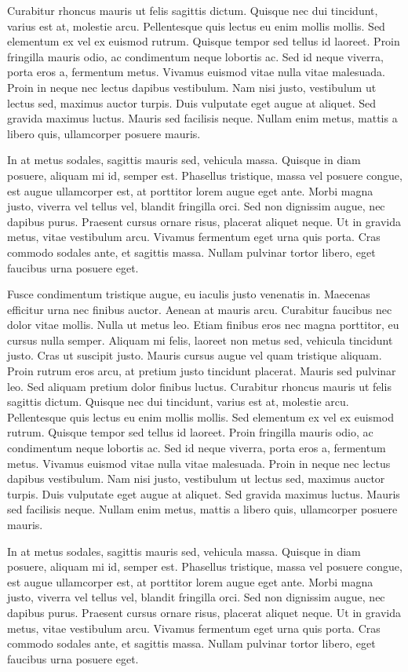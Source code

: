 Curabitur rhoncus mauris ut felis sagittis dictum. Quisque nec dui tincidunt, varius est at, molestie arcu. Pellentesque quis lectus eu enim mollis mollis. Sed elementum ex vel ex euismod rutrum. Quisque tempor sed tellus id laoreet. Proin fringilla mauris odio, ac condimentum neque lobortis ac. Sed id neque viverra, porta eros a, fermentum metus. Vivamus euismod vitae nulla vitae malesuada. Proin in neque nec lectus dapibus vestibulum. Nam nisi justo, vestibulum ut lectus sed, maximus auctor turpis. Duis vulputate eget augue at aliquet. Sed gravida maximus luctus. Mauris sed facilisis neque. Nullam enim metus, mattis a libero quis, ullamcorper posuere mauris.

In at metus sodales, sagittis mauris sed, vehicula massa. Quisque in diam posuere, aliquam mi id, semper est. Phasellus tristique, massa vel posuere congue, est augue ullamcorper est, at porttitor lorem augue eget ante. Morbi magna justo, viverra vel tellus vel, blandit fringilla orci. Sed non dignissim augue, nec dapibus purus. Praesent cursus ornare risus, placerat aliquet neque. Ut in gravida metus, vitae vestibulum arcu. Vivamus fermentum eget urna quis porta. Cras commodo sodales ante, et sagittis massa. Nullam pulvinar tortor libero, eget faucibus urna posuere eget.

Fusce condimentum tristique augue, eu iaculis justo venenatis in. Maecenas efficitur urna nec finibus auctor. Aenean at mauris arcu. Curabitur faucibus nec dolor vitae mollis. Nulla ut metus leo. Etiam finibus eros nec magna porttitor, eu cursus nulla semper. Aliquam mi felis, laoreet non metus sed, vehicula tincidunt justo. Cras ut suscipit justo. Mauris cursus augue vel quam tristique aliquam. Proin rutrum eros arcu, at pretium justo tincidunt placerat. Mauris sed pulvinar leo. Sed aliquam pretium dolor finibus luctus.
Curabitur rhoncus mauris ut felis sagittis dictum. Quisque nec dui tincidunt, varius est at, molestie arcu. Pellentesque quis lectus eu enim mollis mollis. Sed elementum ex vel ex euismod rutrum. Quisque tempor sed tellus id laoreet. Proin fringilla mauris odio, ac condimentum neque lobortis ac. Sed id neque viverra, porta eros a, fermentum metus. Vivamus euismod vitae nulla vitae malesuada. Proin in neque nec lectus dapibus vestibulum. Nam nisi justo, vestibulum ut lectus sed, maximus auctor turpis. Duis vulputate eget augue at aliquet. Sed gravida maximus luctus. Mauris sed facilisis neque. Nullam enim metus, mattis a libero quis, ullamcorper posuere mauris.

In at metus sodales, sagittis mauris sed, vehicula massa. Quisque in diam posuere, aliquam mi id, semper est. Phasellus tristique, massa vel posuere congue, est augue ullamcorper est, at porttitor lorem augue eget ante. Morbi magna justo, viverra vel tellus vel, blandit fringilla orci. Sed non dignissim augue, nec dapibus purus. Praesent cursus ornare risus, placerat aliquet neque. Ut in gravida metus, vitae vestibulum arcu. Vivamus fermentum eget urna quis porta. Cras commodo sodales ante, et sagittis massa. Nullam pulvinar tortor libero, eget faucibus urna posuere eget.

